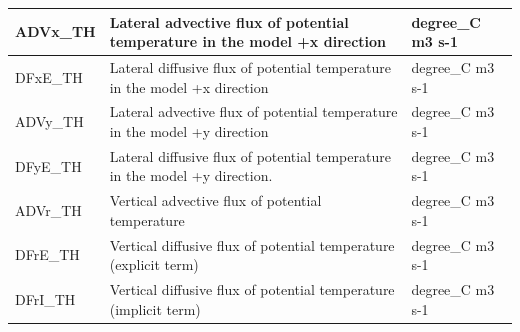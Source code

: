 \begin{longtable}{|m{}|m{}|m{}|}
ADVx\_TH &Lateral advective flux of potential temperature in the model +x direction &degree\_C m3 s-1  \\ \hline
DFxE\_TH &Lateral diffusive flux of potential temperature in the model +x direction &degree\_C m3 s-1  \\ \hline
ADVy\_TH &Lateral advective flux of potential temperature in the model +y direction &degree\_C m3 s-1  \\ \hline
DFyE\_TH &Lateral diffusive flux of potential temperature in the model +y direction. &degree\_C m3 s-1  \\ \hline
ADVr\_TH &Vertical advective flux of potential temperature &degree\_C m3 s-1  \\ \hline
DFrE\_TH &Vertical diffusive flux of potential temperature (explicit term) &degree\_C m3 s-1  \\ \hline
DFrI\_TH &Vertical diffusive flux of potential temperature (implicit term) &degree\_C m3 s-1  \\ \hline
\end{longtable}

\newp
\pagebreak
